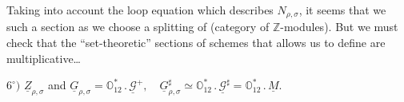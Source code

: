 Taking into account the loop equation which describes $N_{\rho,\sigma}$, it seems that we  such a section  as we choose a splitting of
(category of $\mathbb Z$-modules). But we must check that the \textquotedblleft set-theoretic\textquotedblright{} sections of schemes that  allows us to define are multiplicative\dots


\(6^\circ)\) \(\underline Z_{\rho,\sigma}\) and
\(\underline G_{\rho,\sigma}=\mathbb O_{12}^{*}\mathbin{.}\underline{\mathcal G}^{+},\quad
\underline G_{\rho,\sigma}^{\sharp}\simeq\mathbb O_{12}^{*}\mathbin{.}\underline{\mathcal G}^{\sharp}
=\mathbb O_{12}^{*}\mathbin{.}\underline M\).


